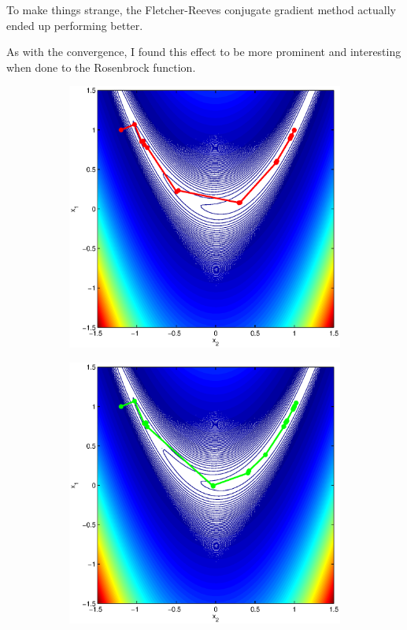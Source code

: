 \documentclass[12pt,parskip=full]{article}
\numberwithin{subsection}{section}
\begin{document}
		To make things strange, the Fletcher-Reeves conjugate gradient method actually ended up performing better.
		
		As with the convergence, I found this effect to be more prominent and interesting when done to the
		Rosenbrock function.
		
		\begin{figure}[!ht]
			\centering
			\begin{subfigure}[h]{0.4\textwidth}
				\includegraphics[width=\textwidth]{ConjGradPRRose.eps}
			\end{subfigure}
			\begin{subfigure}[h]{0.4\textwidth}
				\includegraphics[width=\textwidth]{ConjGradPRRoseCD.eps}

\end{subfigure}
\end{figure}
\end{document}

